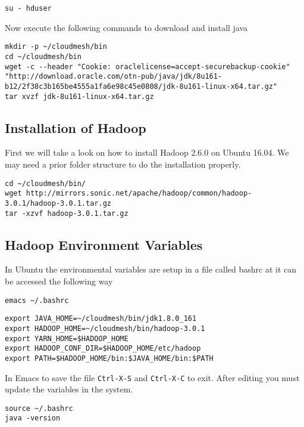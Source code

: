 \begin{lstlisting}
su - hduser
\end{lstlisting}

Now execute the following commands to download and install java

\begin{lstlisting}
mkdir -p ~/cloudmesh/bin
cd ~/cloudmesh/bin
wget -c --header "Cookie: oraclelicense=accept-securebackup-cookie" "http://download.oracle.com/otn-pub/java/jdk/8u161-b12/2f38c3b165be4555a1fa6e98c45e0808/jdk-8u161-linux-x64.tar.gz"
tar xvzf jdk-8u161-linux-x64.tar.gz
\end{lstlisting}

\subsection{Installation of Hadoop}\label{installation-of-hadoop}

First we will take a look on how to install Hadoop 2.6.0 on Ubuntu
16.04. We may need a prior folder structure to do the installation
properly.

\begin{lstlisting}
cd ~/cloudmesh/bin/
wget http://mirrors.sonic.net/apache/hadoop/common/hadoop-3.0.1/hadoop-3.0.1.tar.gz
tar -xzvf hadoop-3.0.1.tar.gz
\end{lstlisting}

\subsection{Hadoop Environment Variables}

In Ubuntu the environmental variables are setup in a file called bashrc
at it can be accessed the following way

\begin{lstlisting}
emacs ~/.bashrc
\end{lstlisting}

\begin{lstlisting}
export JAVA_HOME=~/cloudmesh/bin/jdk1.8.0_161
export HADOOP_HOME=~/cloudmesh/bin/hadoop-3.0.1
export YARN_HOME=$HADOOP_HOME
export HADOOP_CONF_DIR=$HADOOP_HOME/etc/hadoop
export PATH=$HADOOP_HOME/bin:$JAVA_HOME/bin:$PATH
\end{lstlisting}

In Emacs to save the file \verb|Ctrl-X-S| and \verb|Ctrl-X-C| to exit. After editing
you must update the variables in the system.

\begin{lstlisting}
source ~/.bashrc
java -version
\end{lstlisting}

